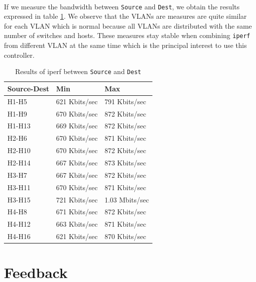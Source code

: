 \documentclass[a4paper, 11pt, oneside]{article}
\begin{document}
\paragraph{}If we measure the bandwidth between \texttt{Source} and \texttt{Dest}, we obtain the results expressed in table \ref{table:VLANs_bw}. We observe that the VLANs are measures are quite similar for each VLAN which is normal because all VLANs are distributed with the same number of switches and hosts. These measures stay stable when combining \texttt{iperf} from different VLAN at the same time which is the principal interest to use this controller.
\begin{table}[H]
    \centering
    \begin{tabular}{|l|l|l|}
    \hline
    \textbf{Source-Dest} & \textbf{Min}  & \textbf{Max}   \\ \hline
    H1-H5                & 621 Kbits/sec & 791 Kbits/sec  \\ \hline
    H1-H9                & 670 Kbits/sec & 872 Kbits/sec  \\ \hline
    H1-H13               & 669 Kbits/sec & 872 Kbits/sec  \\ \hline
    H2-H6                & 670 Kbits/sec & 871 Kbits/sec  \\ \hline
    H2-H10               & 670 Kbits/sec & 872 Kbits/sec  \\ \hline
    H2-H14               & 667 Kbits/sec & 873 Kbits/sec  \\ \hline
    H3-H7                & 667 Kbits/sec & 872 Kbits/sec  \\ \hline
    H3-H11               & 670 Kbits/sec & 871 Kbits/sec  \\ \hline
    H3-H15               & 721 Kbits/sec & 1.03 Mbits/sec \\ \hline
    H4-H8                & 671 Kbits/sec & 872 Kbits/sec  \\ \hline
    H4-H12               & 663 Kbits/sec & 871 Kbits/sec  \\ \hline
    H4-H16               & 621 Kbits/sec & 870 Kbits/sec  \\ \hline
    \end{tabular}
    \caption{Results of iperf between \texttt{Source} and \texttt{Dest}}
    \label{table:VLANs_bw}
    \end{table}


\section{Feedback} \label{sec:feedback}
\end{document}
